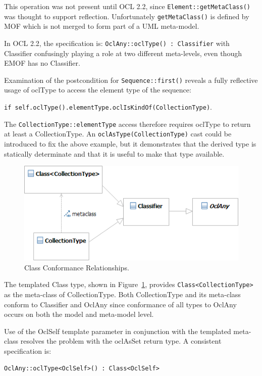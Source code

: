\documentclass{eceasst}
\begin{document}
This operation was not present until OCL 2.2, since \verb!Element::getMetaClass()! was  thought to support reflection. Unfortunately \verb!getMetaClass()! is defined by MOF which is not merged to form part of a UML meta-model.

In OCL 2.2, the specification is: \verb!OclAny::oclType() : Classifier! with Classifier confusingly playing a role at two different meta-levels, even though EMOF has no Classifier.

Examination of the postcondition for \verb|Sequence::first()| reveals a fully reflective usage of oclType to access the element type of the sequence:

\verb|if self.oclType().elementType.oclIsKindOf(CollectionType)|. 

The \verb|CollectionType::elementType| access therefore requires oclType to return at least a CollectionType. An \verb|oclAsType(CollectionType)| cast could be introduced to fix the above example, but it demonstrates that the
derived type is statically determinate and that it is useful to make that type available.

\begin{figure}
  \begin{center}
    \includegraphics[width=4.5in]{Class.png}
  \end{center}
  \caption{Class Conformance Relationships.}
  \label{fig:Class}
\end{figure}

The templated Class type, shown in Figure~\ref{fig:Class}, provides \verb|Class<CollectionType>| as the meta-class of CollectionType. Both CollectionType and its meta-class conform to Classifier and OclAny since conformance of all types to OclAny occurs on  both the model and meta-model level. 

Use of the OclSelf template parameter in conjunction with the templated meta-class resolves the problem with the oclAsSet return type. A consistent specification is:

\verb!OclAny::oclType<OclSelf>() : Class<OclSelf>!
\end{document}
